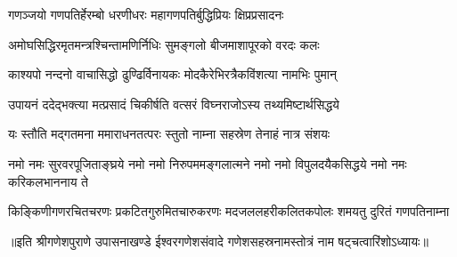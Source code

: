 \twolineshloka
{गणञ्जयो गणपतिर्हेरम्बो धरणीधरः}
{महागणपतिर्बुद्धिप्रियः क्षिप्रप्रसादनः}

\twolineshloka
{अमोघसिद्धिरमृतमन्त्रश्चिन्तामणिर्निधिः}
{सुमङ्गलो बीजमाशापूरको वरदः कलः}

\twolineshloka
{काश्यपो नन्दनो वाचासिद्धो ढुण्ढिर्विनायकः}
{मोदकैरेभिरत्रैकविंशत्या नामभिः पुमान्}

\twolineshloka
{उपायनं ददेद्भक्त्या मत्प्रसादं चिकीर्षति}
{वत्सरं विघ्नराजोऽस्य तथ्यमिष्टार्थसिद्धये}

\twolineshloka
{यः स्तौति मद्गतमना ममाराधनतत्परः}
{स्तुतो नाम्ना सहस्रेण तेनाहं नात्र संशयः}

\fourlineindentedshloka
{नमो नमः सुरवरपूजिताङ्घ्रये}
{नमो नमो निरुपममङ्गलात्मने}
{नमो नमो विपुलदयैकसिद्धये}
{नमो नमः करिकलभाननाय ते}

\fourlineindentedshloka
{किङ्किणीगणरचितचरणः}
{प्रकटितगुरुमितचारुकरणः}
{मदजललहरीकलितकपोलः}
{शमयतु दुरितं गणपतिनाम्ना}

{॥इति श्रीगणेशपुराणे उपासनाखण्डे ईश्वरगणेशसंवादे गणेशसहस्रनामस्तोत्रं नाम षट्चत्वारिंशोऽध्यायः॥}
